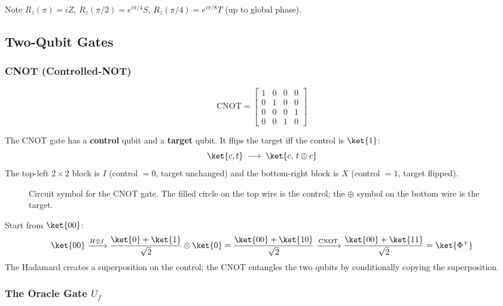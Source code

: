 \documentclass[oneside]{academica}
\begin{document}
Note $R_z(\pi)=iZ$, $R_z(\pi/2)=e^{i\pi/4}S$, $R_z(\pi/4)=e^{i\pi/8}T$ (up to global phase).

\subsection{Two-Qubit Gates}

\subsubsection{CNOT (Controlled-NOT)}

\begin{equation*}
  \mathrm{CNOT}=\begin{bmatrix}1&0&0&0\\0&1&0&0\\0&0&0&1\\0&0&1&0\end{bmatrix}
\end{equation*}

The CNOT gate has a \textbf{control} qubit and a \textbf{target} qubit.
It flips the target iff the control is $\ket{1}$:
\begin{equation*}
  \ket{c,t}\;\longrightarrow\;\ket{c,\, t\oplus c}
\end{equation*}
The top-left $2\times2$ block is $I$ (control $=0$, target unchanged) and the bottom-right block is $X$ (control $=1$, target flipped).

\begin{figure}[H]
  \centering
  
  \caption{Circuit symbol for the CNOT gate.
    The filled circle on the top wire is the control; the $\oplus$ symbol on the bottom wire is the target.
  }
\end{figure}

\begin{example*}
  Start from $\ket{00}$:
  \begin{equation*}
    \ket{00} \xrightarrow{H\otimes I} \frac{\ket{0}+\ket{1}}{\sqrt{2}}\otimes\ket{0}
    =\frac{\ket{00}+\ket{10}}{\sqrt{2}} \xrightarrow{\mathrm{CNOT}} \frac{\ket{00}+\ket{11}}{\sqrt{2}}=\ket{\Phi^+}
  \end{equation*}
  The Hadamard creates a superposition on the control; the CNOT entangles the two qubits by conditionally copying the superposition.
\end{example*}

\subsubsection{The Oracle Gate $U_f$}
\end{document}
